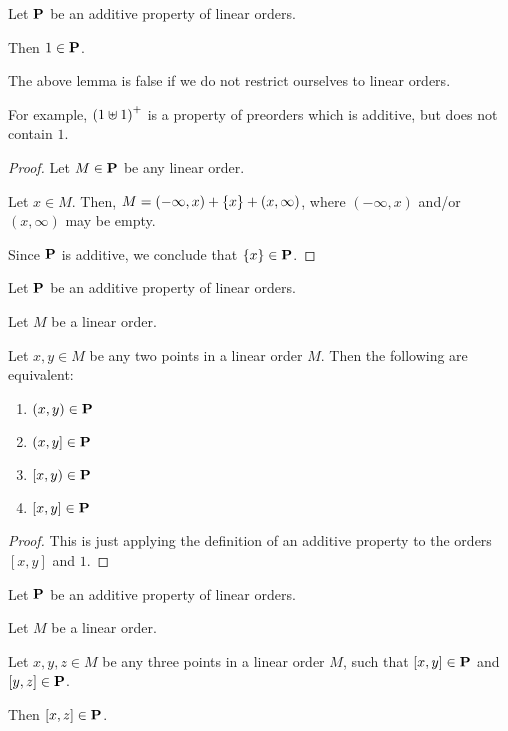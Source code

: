 \begin{lemma}
  Let $\mathbf{P}$ be an additive property of linear orders.

  Then $1 \in \mathbf{P}$.
\end{lemma}

\begin{note}
  The above lemma is false if we do not restrict ourselves to linear orders.

  For example, $\left( {1 \uplus 1} \right)^+$ is a property of preorders
  which is additive, but does not contain $1$.
\end{note}

\begin{proof}
  Let $M \in \mathbf{P}$ be any linear order.

  Let $x \in M$. Then,
  $M = (-\infty, x) + \left\{ {x} \right\} + (x, \infty)$,
  where $(-\infty, x)$ and/or $(x, \infty)$ may be empty.

  Since $\mathbf{P}$ is additive, we conclude that $\left\{ {x} \right\} \in \mathbf{P}$.
\end{proof}

\begin{corollary}\label{additive-endpoints}
  Let $\mathbf{P}$ be an additive property of linear orders.

  Let $M$ be a linear order.

  Let $x, y \in M$ be any two points in a linear order $M$.
  Then the following are equivalent:

  \begin{enumerate}
    \item $(x, y) \in \mathbf{P}$
    \item $(x, y] \in \mathbf{P}$
    \item $[x, y) \in \mathbf{P}$
    \item $[x, y] \in \mathbf{P}$
  \end{enumerate}
\end{corollary}

\begin{proof}
  This is just applying the definition of an additive property
  to the orders $[x, y]$ and $1$.
\end{proof}

\begin{corollary}\label{additive-transitivity}
  Let $\mathbf{P}$ be an additive property of linear orders.

  Let $M$ be a linear order.

  Let $x, y, z \in M$ be any three points in a linear order $M$,
  such that $[x, y] \in \mathbf{P}$ and $[y, z] \in \mathbf{P}$.

  Then $[x, z] \in \mathbf{P}$.
\end{corollary}

